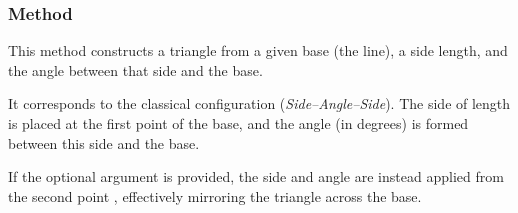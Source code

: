 \begin{minipage}{.5\textwidth}
  \begin{center}
  \end{center}
\end{minipage}
\begin{minipage}{.5\textwidth}
\begin{tkzexample}
\end{tkzexample}
\end{minipage}


\subsubsection{Method } %
\label{ssub:_line_sas_d_an}

This method constructs a triangle from a given base (the line), a side length, and the angle between that side and the base.

\medskip
\noindent
It corresponds to the classical  configuration (\textit{Side–Angle–Side}). The side of length  is placed at the first point  of the base, and the angle  (in degrees) is formed between this side and the base.

\medskip
\noindent
If the optional argument  is provided, the side and angle are instead applied from the second point , effectively mirroring the triangle across the base.

\vspace{1em}
  \begin{center}
  \end{center}

